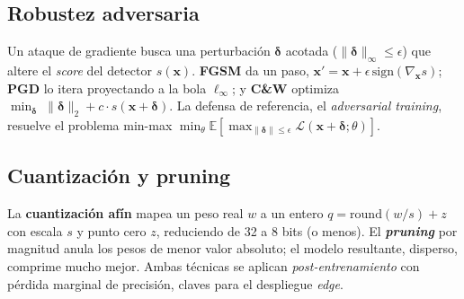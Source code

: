\subsection{Robustez adversaria}
\label{sec:teo-adv}
Un ataque de gradiente busca una perturbación $\bm\delta$ acotada ($\lVert\bm\delta\rVert_\infty\le\epsilon$) que altere el \textit{score} del detector $s(\bm x)$. \textbf{FGSM} \cite{goodfellow2014fgsm} da un paso, $\bm x'=\bm x+\epsilon\,\mathrm{sign}(\nabla_{\bm x}s)$; \textbf{PGD} \cite{madry2018pgd} lo itera proyectando a la bola $\ell_\infty$; y \textbf{C\&W} \cite{carlini2017cw} optimiza $\min_{\bm\delta}\;\lVert\bm\delta\rVert_2+c\cdot s(\bm x+\bm\delta)$. La defensa de referencia, el \emph{adversarial training}, resuelve el problema min-max $\min_\theta\mathbb E[\max_{\lVert\bm\delta\rVert\le\epsilon}\mathcal L(\bm x+\bm\delta;\theta)]$.

\subsection{Cuantización y pruning}
\label{sec:teo-comp}
La \textbf{cuantización afín} \cite{jacob2018quantization} mapea un peso real $w$ a un entero $q=\mathrm{round}(w/s)+z$ con escala $s$ y punto cero $z$, reduciendo de 32 a 8 bits (o menos). El \textbf{\textit{pruning}} por magnitud \cite{han2016deepcompression} anula los pesos de menor valor absoluto; el modelo resultante, disperso, comprime mucho mejor. Ambas técnicas se aplican \emph{post-entrenamiento} con pérdida marginal de precisión, claves para el despliegue \textit{edge}.
